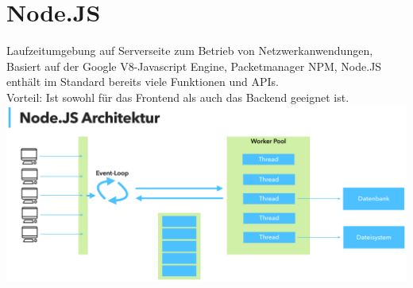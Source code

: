 \documentclass[12pt,a4paper]{article}
\begin{document}
\section{Node.JS}
Laufzeitumgebung auf Serverseite zum Betrieb von Netzwerkanwendungen, Basiert auf der Google V8-Javascript Engine, Packetmanager NPM, Node.JS enthält im Standard bereits viele Funktionen und APIs. \\
Vorteil: Ist sowohl für das Frontend als auch das Backend geeignet ist.\\
\includegraphics[width=\textwidth]{Bilder/nodejs.PNG}
\end{document}
